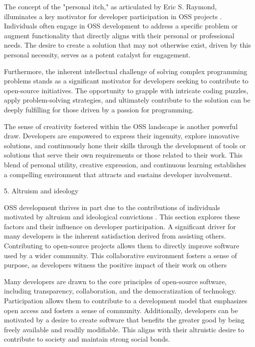 The concept of the "personal itch," as articulated by Eric S. Raymond, illuminates a key motivator for developer participation in OSS projects \citep{holtgrewe2004articulating}. Individuals often engage in OSS development to address a specific problem or augment functionality that directly aligns with their personal or professional needs. The desire to create a solution that may not otherwise exist, driven by this personal necessity, serves as a potent catalyst for engagement.

Furthermore, the inherent intellectual challenge of solving complex programming problems stands as a significant motivator for developers seeking to contribute to open-source initiatives. The opportunity to grapple with intricate coding puzzles, apply problem-solving strategies, and ultimately contribute to the solution can be deeply fulfilling for those driven by a passion for programming.

The sense of creativity fostered within the OSS landscape is another powerful draw. Developers are empowered to express their ingenuity, explore innovative solutions, and continuously hone their skills through the development of tools or solutions that serve their own requirements or those related to their work. This blend of personal utility, creative expression, and continuous learning establishes a compelling environment that attracts and sustains developer involvement.

5. Altruism and ideology

OSS development thrives in part due to the contributions of individuals motivated by altruism and ideological convictions \citep{07zhao2024openrank,08zhang2024paid,10wu2007empirical,11gerosa2021shifting,13li2012leadership,16ke2008motivations,17alexander2002working,18oreg2008exploring}. This section explores these factors and their influence on developer participation. A significant driver for many developers is the inherent satisfaction derived from assisting others. Contributing to open-source projects allows them to directly improve software used by a wider community. This collaborative environment fosters a sense of purpose, as developers witness the positive impact of their work on others

Many developers are drawn to  the core principles of open-source software, including transparency, collaboration, and the democratization of technology. Participation allows them to contribute to a development model that emphasizes open access and fosters a sense of community.  Additionally, developers can be motivated by a desire to create software that benefits the greater good by being freely available and readily modifiable. This aligns with their altruistic desire to contribute to society and maintain strong social bonds.

